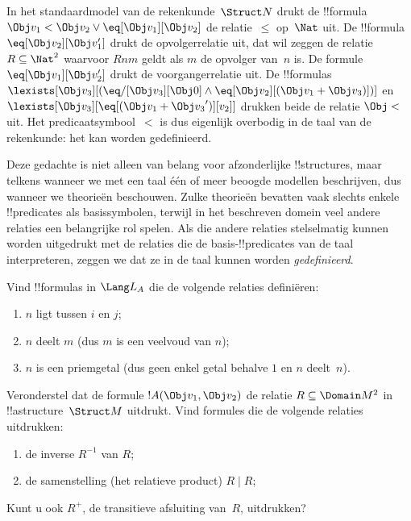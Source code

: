 \documentclass[openany]{memoir}
\begin{document}
\begin{ex}
In het standaardmodel van de rekenkunde~$\Struct N$ drukt de
!!{formula} $\Obj v_1 < \Obj v_2 \lor \eq[\Obj v_1][\Obj v_2]$ de
relatie~$\le$ op~$\Nat$ uit. De !!{formula}
$\eq[\Obj v_2][\Obj v_1']$ drukt de opvolgerrelatie uit, dat wil zeggen
de relatie $R \subseteq \Nat^2$ waarvoor $Rnm$ geldt als $m$ de
opvolger van~$n$ is. De formule $\eq[\Obj v_1][\Obj v_2']$ drukt de
voorgangerrelatie uit. De !!{formula}s
$\lexists[\Obj v_3][(\eq/[\Obj v_3][\Obj 0] \land
  \eq[\Obj v_2][(\Obj v_1 + \Obj v_3)])]$ en $\lexists[\Obj
  v_3][\eq[(\Obj v_1 + {\Obj v_3}')][v_2]]$ drukken beide de relatie
$\Obj <$ uit. Het predicaatsymbool~$<$ is dus eigenlijk overbodig in
de taal van de rekenkunde: het kan worden gedefinieerd.
\end{ex}

\begin{explain}
Deze gedachte is niet alleen van belang voor afzonderlijke
!!{structure}s, maar telkens wanneer we met een taal één of meer
beoogde modellen beschrijven, dus wanneer we theorieën beschouwen.
Zulke theorieën bevatten vaak slechts enkele !!{predicate}s als
basissymbolen, terwijl in het beschreven domein veel andere relaties
een belangrijke rol spelen. Als die andere relaties stelselmatig
kunnen worden uitgedrukt met de relaties die de basis-!!{predicate}s
van de taal interpreteren, zeggen we dat ze in de taal kunnen worden
\emph{gedefinieerd}.
\end{explain}

\begin{prob}
Vind !!{formula}s in $\Lang L_A$ die de volgende relaties definiëren:
\begin{enumerate}
\item $n$ ligt tussen $i$ en $j$;
\item $n$ deelt $m$ (dus $m$ is een veelvoud van $n$);
\item $n$ is een priemgetal (dus geen enkel getal behalve $1$ en $n$
  deelt~$n$).
\end{enumerate}
\end{prob}

\begin{prob}
Veronderstel dat de formule $!A(\Obj v_1, \Obj v_2)$ de relatie $R
\subseteq \Domain M^2$ in !!a{structure}~$\Struct M$ uitdrukt. Vind
formules die de volgende relaties uitdrukken:
\begin{enumerate}
\item de inverse $R^{-1}$ van $R$;
\item de samenstelling (het relatieve product) $R \mid R$;
\end{enumerate}
Kunt u ook $R^+$, de transitieve afsluiting van~$R$, uitdrukken?
\end{prob}
\end{document}
